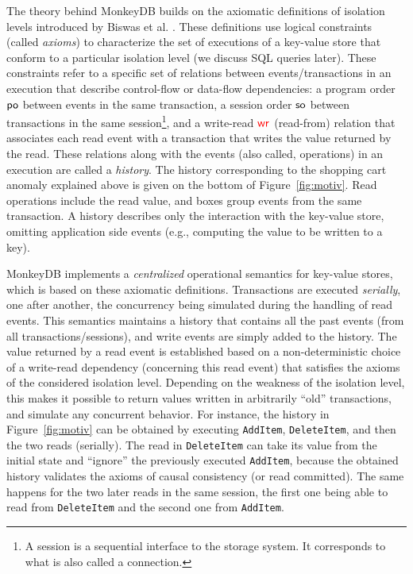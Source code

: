 
The theory behind MonkeyDB builds on the axiomatic definitions of isolation
levels introduced by Biswas et al. \cite{DBLP:journals/pacmpl/BiswasE19}. These
definitions use logical constraints (called \emph{axioms}) to characterize the
set of executions of a key-value store that conform to a particular isolation
level (we discuss SQL queries later). These constraints refer to a specific set of
relations between events/transactions in an execution that describe control-flow
or data-flow dependencies: a program order $\mathsf{po}$ between events in the same
transaction, a session order $\mathsf{so}$ between transactions in the same session\footnote{A
session is a sequential interface to the storage system. It corresponds to what
is also called a connection.}, and a write-read $\textcolor{red}{\mathsf{wr}_{}}$ (read-from) relation that
associates each read event with a transaction that writes the value returned by
the read. These relations along with the events (also called, operations) in an
execution are called a \emph{history}. The history corresponding to the 
shopping cart anomaly explained above is given on the bottom of Figure~\ref{fig:motiv}.
Read operations include the read value, and boxes group events from the same transaction.
A history describes only the
interaction with the key-value store, omitting application side events (e.g., computing
the value to be written to a key). 

MonkeyDB implements a \emph{centralized} operational semantics for key-value stores, which is based on these axiomatic definitions. Transactions are executed \emph{serially}, one after another, the concurrency being simulated during the handling of read events.  
This semantics maintains a history that contains all the past events (from all
transactions/sessions), and write events are simply added to the history. The
value returned by a read event is established based on a non-deterministic
choice of a write-read dependency (concerning this read event) that satisfies
the axioms of the considered isolation level.
Depending on the weakness of the isolation
level, this makes it possible to return values written in arbitrarily ``old''
transactions, and simulate any concurrent behavior. For instance, the history in Figure~\ref{fig:motiv}
can be obtained by executing \texttt{AddItem}, \texttt{DeleteItem}, and then the two reads (serially).
The read in \texttt{DeleteItem} can take its value from the initial state and ``ignore'' the
previously executed \texttt{AddItem}, because the obtained history validates the axioms of 
causal consistency (or read committed). The same happens for the two later reads in the same
session, the first one being able to read from \texttt{DeleteItem} and the second one
from \texttt{AddItem}.

